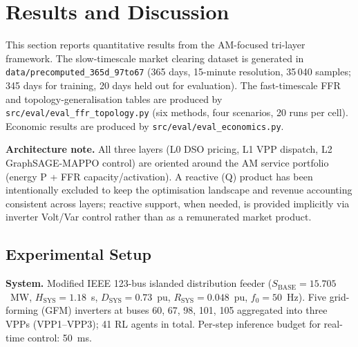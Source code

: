 \section{Results and Discussion}
\label{sec:results}
%

This section reports quantitative results from the AM-focused tri-layer
framework. The slow-timescale market clearing dataset is generated in
\texttt{data/precomputed\_365d\_97to67} (365 days, 15-minute resolution,
35\,040 samples; 345 days for training, 20 days held out for evaluation).
The fast-timescale FFR and topology-generalisation tables are produced by
\texttt{src/eval/eval\_ffr\_topology.py} (six methods, four scenarios, 20 runs
per cell). Economic results are produced by \texttt{src/eval/eval\_economics.py}.

\smallskip
\noindent\textbf{Architecture note.} All three layers (L0 DSO pricing,
L1 VPP dispatch, L2 GraphSAGE-MAPPO control) are oriented around the AM
service portfolio (energy P + FFR capacity/activation). A reactive (Q)
product has been intentionally excluded to keep the optimisation
landscape and revenue accounting consistent across layers; reactive
support, when needed, is provided implicitly via inverter Volt/Var
control rather than as a remunerated market product.

\subsection{Experimental Setup}
\label{ssec:setup}

\textbf{System.} Modified IEEE 123-bus islanded distribution feeder
($S_{\text{BASE}}=15.705$~MW, $H_{\text{SYS}}=1.18$~s, $D_{\text{SYS}}=0.73$~pu,
$R_{\text{SYS}}=0.048$~pu, $f_0=50$~Hz). Five grid-forming (GFM) inverters at
buses 60, 67, 98, 101, 105 aggregated into three VPPs (VPP1--VPP3); 41 RL
agents in total. Per-step inference budget for real-time control: 50~ms.

